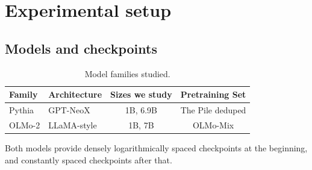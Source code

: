 \documentclass[11pt,a4paper]{article}
\begin{document}



\section{Experimental setup}

\subsection{Models and checkpoints}

\begin{table}[ht]
  \centering
  \caption{Model families studied.}
  \label{tab:models}
  \begin{tabular}{llcc}
    \toprule
    Family & Architecture & Sizes we study & Pretraining Set \\
    \midrule
    Pythia & GPT-NeoX & 1B, 6.9B & The Pile deduped \\
    OLMo-2 & LLaMA-style & 1B, 7B & OLMo-Mix \\
    \bottomrule
  \end{tabular}
\end{table}

Both models provide densely logarithmically spaced checkpoints at the beginning, and constantly spaced checkpoints after that.
\end{document}
